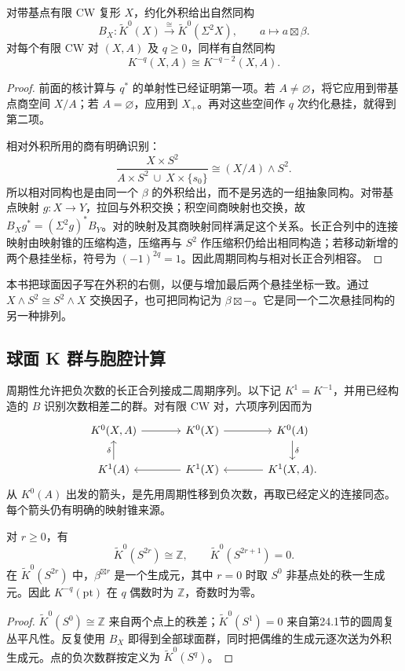 \begin{theorem}\label{g2:thm:complex-bott-periodicity}
	对带基点有限 CW 复形 \(X\)，约化外积给出自然同构
	\[
		B_X:\widetilde K^0(X)\xrightarrow{\ \cong\ }\widetilde K^0(\Sigma^2X),
		\qquad a\longmapsto a\boxtimes\beta.
	\]
	对每个有限 CW 对 \((X,A)\) 及 \(q\ge0\)，同样有自然同构
	\[
		K^{-q}(X,A)\cong K^{-q-2}(X,A).
	\]
\end{theorem}
\begin{proof}
	前面的核计算与 \(q^*\) 的单射性已经证明第一项。若 \(A\ne\varnothing\)，将它应用到带基点商空间 \(X/A\)；若 \(A=\varnothing\)，应用到 \(X_+\)。再对这些空间作 \(q\) 次约化悬挂，就得到第二项。

	相对外积所用的商有明确识别：
	\[
		\frac{X\times S^2}{A\times S^2\ \cup\ X\times\{s_0\}}
		\cong (X/A)\wedge S^2.
	\]
	所以相对同构也是由同一个 \(\beta\) 的外积给出，而不是另选的一组抽象同构。对带基点映射 \(g:X\to Y\)，拉回与外积交换；积空间商映射也交换，故 \(B_Xg^*=(\Sigma^2g)^*B_Y\)。对的映射及其商映射同样满足这个关系。长正合列中的连接映射由映射锥的压缩构造，压缩再与 \(S^2\) 作压缩积仍给出相同构造；若移动新增的两个悬挂坐标，符号为 \((-1)^{2q}=1\)。因此周期同构与相对长正合列相容。
\end{proof}

本书把球面因子写在外积的右侧，以便与增加最后两个悬挂坐标一致。通过 \(X\wedge S^2\cong S^2\wedge X\) 交换因子，也可把同构记为 \(\beta\boxtimes-\)。它是同一个二次悬挂同构的另一种排列。

\subsection{球面 K 群与胞腔计算}
\label{g2:subsec:2403:08}
周期性允许把负次数的长正合列接成二周期序列。以下记 \(K^1=K^{-1}\)，并用已经构造的 \(B\) 识别次数相差二的群。对有限 CW 对，六项序列因而为
\[
	\begin{tikzcd}[column sep=large]
		K^0(X,A)\arrow[r]&K^0(X)\arrow[r]&K^0(A)\arrow[d,"\delta"]\\
		K^1(A)\arrow[u,"\delta"]&K^1(X)\arrow[l]&K^1(X,A)\arrow[l].
	\end{tikzcd}
\]
从 \(K^0(A)\) 出发的箭头，是先用周期性移到负次数，再取已经定义的连接同态。每个箭头仍有明确的映射锥来源。

\begin{proposition}\label{g2:prop:k-sphere-coefficients}
	对 \(r\ge0\)，有
	\[
		\widetilde K^0(S^{2r})\cong\mathbb Z,\qquad
		\widetilde K^0(S^{2r+1})=0.
	\]
	在 \(\widetilde K^0(S^{2r})\) 中，\(\beta^{\boxtimes r}\) 是一个生成元，其中 \(r=0\) 时取 \(S^0\) 非基点处的秩一生成元。因此 \(K^{-q}(\mathrm{pt})\) 在 \(q\) 偶数时为 \(\mathbb Z\)，奇数时为零。
\end{proposition}
\begin{proof}
	\(\widetilde K^0(S^0)\cong\mathbb Z\) 来自两个点上的秩差；\(\widetilde K^0(S^1)=0\) 来自第24.1节的圆周复丛平凡性。反复使用 \(B_X\) 即得到全部球面群，同时把偶维的生成元逐次送为外积生成元。点的负次数群按定义为 \(\widetilde K^0(S^q)\)。
\end{proof}

